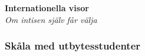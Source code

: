 \begin{center}
    \vspace*{1.5cm}
    {\fontsize{20}{20}\textbf{Internationella visor}}\\
    \vspace{0.7cm}
    {\fontsize{12}{12}\textit{Om intisen själv får välja}}
\end{center}
\noBackground

\newpage
\resetBackground

\subsubsection*{Skåla med utbytesstudenter}

